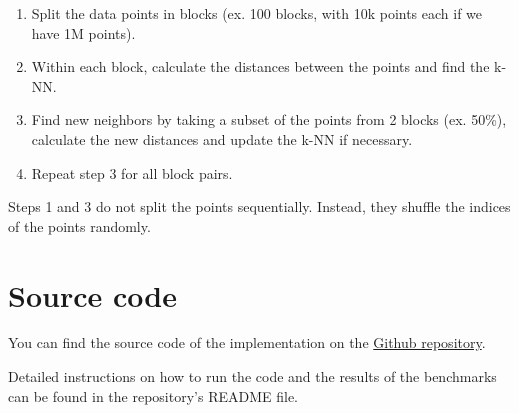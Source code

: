 \documentclass{article}
\begin{document}
\begin{enumerate}
    \item Split the data points in blocks (ex. 100 blocks, with 10k points each if we have 1M points).
    \item Within each block, calculate the distances between the points and find the k-NN.
    \item Find new neighbors by taking a subset of the points from 2 blocks (ex. 50\%), calculate the new distances and update the k-NN if necessary.
    \item Repeat step 3 for all block pairs.
\end{enumerate}

Steps 1 and 3 do not split the points sequentially. Instead, they shuffle the indices of the points randomly.

\section{Source code}
You can find the source code of the implementation on the 
\href{https://github.com/NontasBak/auth-parallel-ex1}{Github repository}. 

Detailed instructions on how to run the code and the results of the benchmarks can be found in the repository's README file.
\end{document}
